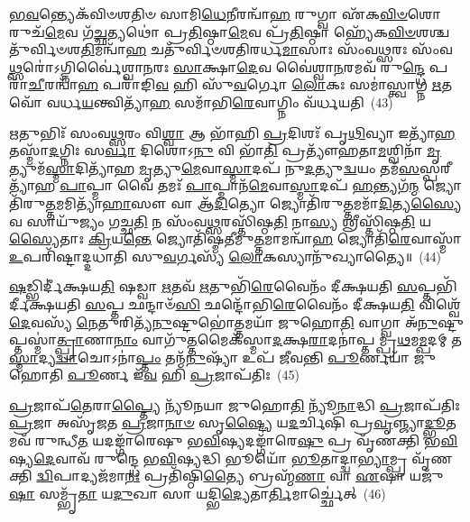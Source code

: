 \-\ul{𑌭}\-\-\ul{𑌵}\-𑌨𑍍𑌤𑍍𑌯𑍇𑌕᳴𑌵𑌿𑍞𑌶𑌤𑌿𑍞 𑌸𑌾𑌮𑌿\-\ul{𑌧𑍇}\-𑌨𑍀𑌰𑌨𑍍𑌵𑌾᳴\-\ul{𑌹} 𑌰𑍁𑌗𑍍𑌵𑌾 𑌏᳴𑌕\-\ul{𑌵𑌿}\-\-\ul{𑍞}\-𑌶𑍋 𑌰𑍁𑌚᳴\-\ul{𑌮𑍇}\-𑌵 𑌗᳴\-\ul{𑌚𑍍𑌛}\-𑌤𑍍𑌯𑌥𑍋॑ 𑌪𑍍𑌰\-\ul{𑌤𑌿}\-𑌷𑍍𑌠𑌾\-\ul{𑌮𑍇}\-𑌵 𑌪𑍍𑌰᳴\-\ul{𑌤𑌿}\-𑌷𑍍𑌠𑌾 𑌹𑍍𑌯𑍇᳴𑌕\-\ul{𑌵𑌿}\-\-\ul{𑍞}\-𑌶𑌶𑍍𑌚𑌤𑍁᳴𑌰𑍍𑌵𑌿𑍞𑌶\-\ul{𑌤𑌿}\-𑌮𑌨𑍍𑌵𑌾᳴\-\ul{𑌹} 𑌚𑌤𑍁᳴𑌰𑍍𑌵𑌿𑍞𑌶𑌤𑌿𑌰𑌰𑍍𑌧\-\ul{𑌮𑌾}\-𑌸𑌾𑌃 𑌸𑌂᳴𑌵\-\ul{𑌥𑍍𑌸}\-𑌰𑌃 𑌸𑌂᳴𑌵\-\ul{𑌥𑍍𑌸}\-𑌰𑍋॑\-𑌽𑌗𑍍𑌨𑌿𑌰𑍍𑌵𑍈॑𑌶𑍍𑌵𑌾\-\ul{𑌨}\-𑌰𑌃 \ul{𑌸𑌾}\-𑌕𑍍𑌷𑌾\-\ul{𑌦𑍇}\-𑌵 𑌵𑍈॑𑌶𑍍𑌵𑌾\-\ul{𑌨}\-𑌰𑌮𑌵᳴ 𑌰𑍁\-\ul{𑌨𑍍𑌦𑍍𑌧𑍇} 𑌪𑌰𑌾᳴\-\ul{𑌚𑍀}\-𑌰𑌨𑍍𑌵𑌾᳴\-\ul{𑌹} 𑌪𑌰𑌾᳴𑌙𑌿\-\ul{𑌵} 𑌹𑌿 𑌸𑍁᳴\-\ul{𑌵}\-𑌰𑍍𑌗𑍋 \ul{𑌲𑍋}\-𑌕𑌃 𑌸𑌮𑌾॑𑌸𑍍𑌤𑍍𑌵𑌾𑌗𑍍𑌨 \ul{𑌋}\-𑌤𑌵𑍋᳴ 𑌵𑌰𑍍𑌧\-\ul{𑌯}\-𑌨𑍍𑌤𑍍𑌵𑌿𑌤𑍍𑌯𑌾᳴\-\ul{𑌹} 𑌸𑌮𑌾᳴𑌭𑌿\-\ul{𑌰𑍇}\-𑌵𑌾𑌗𑍍𑌨𑌿𑌂 𑌵᳴𑌰𑍍𑌧𑌯𑌤𑌿~(43)

\-\ul{𑌋}\-𑌤𑍁𑌭𑌿𑌃᳴ 𑌸𑌂𑌵\-\ul{𑌥𑍍𑌸}\-𑌰𑌂 𑌵𑌿\-\ul{𑌶𑍍𑌵𑌾} 𑌆 𑌭𑌾᳴𑌹𑌿 \ul{𑌪𑍍𑌰}\-𑌦𑌿𑌶𑌃᳴ 𑌪𑍃\-\ul{𑌥𑌿}\-𑌵𑍍𑌯𑌾 𑌇𑌤𑍍𑌯𑌾᳴\-\ul{𑌹} 𑌤𑌸𑍍𑌮𑌾᳴\-\ul{𑌦}\-𑌗𑍍𑌨𑌿𑌃 𑌸\-\ul{𑌰𑍍𑌵𑌾} 𑌦𑌿𑌶𑍋\-𑌽\-\ul{𑌨𑍁} 𑌵𑌿 𑌭𑌾᳴\-\ul{𑌤𑌿} 𑌪𑍍𑌰𑌤𑍍𑌯𑍗᳴𑌹𑌤𑌾\-\ul{𑌮}\-𑌶𑍍𑌵𑌿𑌨𑌾᳴ \ul{𑌮𑍃}\-𑌤𑍍𑌯𑍁𑌮᳴\-\ul{𑌸𑍍𑌮𑌾}\-𑌦𑌿𑌤𑍍𑌯𑌾᳴𑌹 \ul{𑌮𑍃}\-𑌤𑍍𑌯𑍁\-\ul{𑌮𑍇}\-𑌵𑌾\-\ul{𑌸𑍍𑌮𑌾}\-𑌦𑌪᳴ 𑌨𑍁\-\ul{𑌦}\-𑌤𑍍𑌯𑍁\-\ul{𑌦𑍍𑌵}\-𑌯𑌂 𑌤𑌮᳴\-\ul{𑌸}\-𑌸𑍍𑌪𑌰𑍀𑌤𑍍𑌯𑌾᳴𑌹 \ul{𑌪𑌾}\-𑌪𑍍𑌮𑌾 𑌵𑍈 𑌤𑌮𑌃᳴ \ul{𑌪𑌾}\-𑌪𑍍𑌮𑌾𑌨᳴\-\ul{𑌮𑍇}\-𑌵𑌾\-\ul{𑌸𑍍𑌮𑌾}\-𑌦𑌪᳴ \ul{𑌹}\-𑌨𑍍𑌤𑍍𑌯𑌗᳴\-\ul{𑌨𑍍𑌮} 𑌜𑍍𑌯𑍋𑌤𑌿᳴𑌰𑍁\-\ul{𑌤𑍍𑌤}\-𑌮𑌮𑌿𑌤𑍍𑌯𑌾᳴\-\ul{𑌹𑌾}\-𑌸𑍗 𑌵𑌾 𑌆᳴\-\ul{𑌦𑌿}\-𑌤𑍍𑌯𑍋 𑌜𑍍𑌯𑍋𑌤𑌿᳴𑌰𑍁\-\ul{𑌤𑍍𑌤}\-𑌮𑌮𑌾᳴\-\ul{𑌦𑌿}\-𑌤𑍍𑌯\-\ul{𑌸𑍍𑌯𑍈}\-𑌵 𑌸𑌾𑌯𑍁᳴𑌜𑍍𑌯𑌂 𑌗𑌚𑍍𑌛\-\ul{𑌤𑌿} 𑌨 𑌸𑌂᳴𑌵\-\ul{𑌥𑍍𑌸}\-𑌰𑌸𑍍𑌤𑌿᳴𑌷𑍍𑌠\-\ul{𑌤𑌿} 𑌨𑌾\-\ul{𑌸𑍍𑌯} 𑌶𑍍𑌰𑍀𑌸𑍍𑌤𑌿᳴𑌷𑍍𑌠\-\ul{𑌤𑌿} 𑌯\-\ul{𑌸𑍍𑌯𑍈}\-𑌤𑌾𑌃 \ul{𑌕𑍍𑌰𑌿}\-𑌯\-\ul{𑌨𑍍𑌤𑍇} 𑌜𑍍𑌯𑍋𑌤𑌿᳴𑌷𑍍𑌮𑌤𑍀𑌮𑍁\-\ul{𑌤𑍍𑌤}\-𑌮𑌾𑌮𑌨𑍍𑌵𑌾᳴\-\ul{𑌹} 𑌜𑍍𑌯𑍋𑌤𑌿᳴\-\ul{𑌰𑍇}\-𑌵𑌾𑌸𑍍𑌮𑌾᳴ \ul{𑌉}\-𑌪𑌰𑌿᳴𑌷𑍍𑌟𑌾𑌦𑍍𑌦𑌧𑌾𑌤𑌿 𑌸𑍁\-\ul{𑌵}\-𑌰𑍍𑌗𑌸𑍍𑌯᳴ \ul{𑌲𑍋}\-𑌕𑌸𑍍𑌯𑌾𑌨𑍁᳴𑌖𑍍𑌯𑌾𑌤𑍍𑌯𑍈॥~(44)

{\anuvakamend[{𑌯𑌾𑌵᳴𑌨𑍍𑌤𑍋\-𑌽𑌸𑍍𑌯 𑌮𑍁\-\ul{𑌖}\-𑌤𑌶𑍍𑌚𑌿𑌤𑍍𑌯᳴𑌸𑍍𑌯 𑌵𑌰𑍍𑌧𑌯𑌤𑍍𑌯𑌾\-\ul{𑌦𑌿}\-𑌤𑍍𑌯𑍋॑\-𑌽𑌷𑍍𑌟𑌾𑌵𑌿𑍞᳴𑌶𑌤𑌿𑌶𑍍𑌚}]}%

\-\ul{𑌷}\-𑌡𑍍𑌭𑌿𑌰𑍍𑌦𑍀॑𑌕𑍍𑌷𑌯\-\ul{𑌤𑌿} 𑌷𑌡𑍍𑌵𑌾 \ul{𑌋}\-𑌤𑌵᳴ \ul{𑌋}\-𑌤𑍁𑌭𑌿᳴\-\ul{𑌰𑍇}\-𑌵𑍈𑌨𑌂᳴ 𑌦𑍀𑌕𑍍𑌷𑌯𑌤𑌿 \ul{𑌸}\-𑌪𑍍𑌤𑌭𑌿᳴𑌰𑍍𑌦𑍀𑌕𑍍𑌷𑌯𑌤𑌿 \ul{𑌸}\-𑌪𑍍𑌤 𑌛𑌨𑍍𑌦𑌾𑍞᳴\-\ul{𑌸𑌿} 𑌛𑌨𑍍𑌦𑍋᳴𑌭𑌿\-\ul{𑌰𑍇}\-𑌵𑍈𑌨𑌂᳴ 𑌦𑍀𑌕𑍍𑌷𑌯\-\ul{𑌤𑌿} 𑌵𑌿𑌶𑍍𑌵𑍇᳴ \ul{𑌦𑍇}\-𑌵𑌸𑍍𑌯᳴ \ul{𑌨𑍇}\-𑌤𑍁𑌰𑌿𑌤𑍍𑌯᳴\-\ul{𑌨𑍁}\-𑌷𑍍𑌟𑍁𑌭𑍋॑\-\ul{𑌤𑍍𑌤}\-𑌮𑌯𑌾᳴ 𑌜𑍁𑌹𑍋\-\ul{𑌤𑌿} 𑌵𑌾𑌗𑍍𑌵𑌾 𑌅᳴\-\ul{𑌨𑍁}\-𑌷𑍍𑌟𑍁𑌪𑍍𑌤𑌸𑍍𑌮𑌾॑\-\ul{𑌤𑍍𑌪𑍍𑌰𑌾}\-𑌣𑌾\-\ul{𑌨𑌾𑌂} 𑌵𑌾𑌗𑍁᳴\-\ul{𑌤𑍍𑌤}\-𑌮𑍈𑌕᳴𑌸𑍍𑌮𑌾\-\ul{𑌦}\-𑌕𑍍𑌷\-\ul{𑌰𑌾}\-𑌦𑌨𑌾॑𑌪𑍍𑌤𑌮𑍍𑌪𑍍𑌰\-\ul{𑌥}\-𑌮\-\ul{𑌮𑍍𑌪}\-𑌦𑌮𑍍 𑌤\-\ul{𑌸𑍍𑌮𑌾}\-𑌦𑍍𑌯\-\ul{𑌦𑍍𑌵𑌾}\-𑌚𑍋\-𑌽𑌨𑌾॑\-\ul{𑌪𑍍𑌤𑌂} 𑌤𑌨𑍍𑌮᳴\-\ul{𑌨𑍁}\-𑌷𑍍𑌯𑌾᳴ 𑌉𑌪᳴ 𑌜𑍀𑌵𑌨𑍍𑌤𑌿 \ul{𑌪𑍂}\-𑌰𑍍𑌣𑌯𑌾᳴ 𑌜𑍁𑌹𑍋𑌤𑌿 \ul{𑌪𑍂}\-𑌰𑍍𑌣 𑌇᳴\-\ul{𑌵} 𑌹𑌿 \ul{𑌪𑍍𑌰}\-𑌜𑌾𑌪᳴𑌤𑌿𑌃~(45)

\-\ul{𑌪𑍍𑌰}\-𑌜𑌾𑌪᳴\-\ul{𑌤𑍇}\-𑌰𑌾\-\ul{𑌪𑍍𑌤𑍍𑌯𑍈} 𑌨𑍍𑌯𑍂᳴𑌨𑌯𑌾 𑌜𑍁𑌹𑍋\-\ul{𑌤𑌿} 𑌨𑍍𑌯𑍂᳴\-\ul{𑌨𑌾}\-𑌦𑍍𑌧𑌿 \ul{𑌪𑍍𑌰}\-𑌜𑌾𑌪᳴𑌤𑌿𑌃 \ul{𑌪𑍍𑌰}\-𑌜𑌾 𑌅𑌸𑍃᳴𑌜𑌤 \ul{𑌪𑍍𑌰}\-𑌜𑌾\-\ul{𑌨𑌾}\-\-\ul{𑍞} 𑌸𑍃\-\ul{𑌷𑍍𑌟𑍍𑌯𑍈} 𑌯\-\ul{𑌦}\-𑌰𑍍𑌚𑌿𑌷𑌿᳴ 𑌪𑍍𑌰\-\ul{𑌵𑍃}\-𑌞𑍍𑌜𑍍𑌯𑌾\-\ul{𑌦𑍍𑌭𑍂}\-𑌤𑌮𑌵᳴ 𑌰𑍁𑌨𑍍𑌧𑍀\-\ul{𑌤} 𑌯𑌦𑌙𑍍𑌗𑌾᳴𑌰𑍇𑌷𑍁 𑌭\-\ul{𑌵𑌿}\-𑌷𑍍𑌯𑌦𑌙𑍍𑌗𑌾᳴𑌰𑍇\-\ul{𑌷𑍁} 𑌪𑍍𑌰 𑌵𑍃᳴𑌣𑌕𑍍𑌤𑌿 𑌭\-\ul{𑌵𑌿}\-𑌷𑍍𑌯\-\ul{𑌦𑍇}\-𑌵𑌾𑌵᳴ 𑌰𑍁𑌨𑍍𑌦𑍍𑌧𑍇 𑌭\-\ul{𑌵𑌿}\-𑌷𑍍𑌯𑌦𑍍𑌧𑌿 𑌭𑍂𑌯𑍋᳴ \ul{𑌭𑍂}\-𑌤𑌾𑌦𑍍𑌦𑍍𑌵𑌾\-\ul{𑌭𑍍𑌯𑌾}\-𑌮𑍍𑌪𑍍𑌰 𑌵𑍃᳴𑌣𑌕𑍍𑌤𑌿 \ul{𑌦𑍍𑌵𑌿}\-𑌪𑌾𑌦𑍍𑌯𑌜᳴𑌮𑌾\-\ul{𑌨𑌃} 𑌪𑍍𑌰𑌤𑌿᳴𑌷𑍍𑌠𑌿\-\ul{𑌤𑍍𑌯𑍈} 𑌬𑍍𑌰𑌹𑍍𑌮᳴\-\ul{𑌣𑌾} 𑌵𑌾 \ul{𑌏}\-𑌷𑌾 𑌯𑌜𑍁᳴\-\ul{𑌷𑌾} 𑌸𑌮𑍍𑌭𑍃᳴\-\ul{𑌤𑌾} 𑌯\-\ul{𑌦𑍁}\-𑌖𑌾 𑌸𑌾 𑌯𑌦𑍍𑌭𑌿\-\ul{𑌦𑍍𑌯𑍇}\-𑌤𑌾\-\ul{𑌰𑍍𑌤𑌿}\-𑌮𑌾𑌰𑍍𑌚𑍍𑌛𑍇॑𑌤𑍍~(46)


